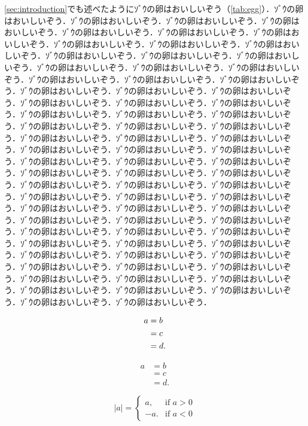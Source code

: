 \documentclass[
	10pt,
	a4j,		%
	twocolumn,	%
	uplatex
]{jsarticle}
\renewcommand{\ref}{\cref}
\begin{document}
\ref{sec:introduction}でも述べたようにｿﾞｳの卵はおいしいぞう（\ref{tab:egg}）．ｿﾞｳの卵はおいしいぞう．ｿﾞｳの卵はおいしいぞう．ｿﾞｳの卵はおいしいぞう．ｿﾞｳの卵はおいしいぞう．ｿﾞｳの卵はおいしいぞう．ｿﾞｳの卵はおいしいぞう．ｿﾞｳの卵はおいしいぞう．ｿﾞｳの卵はおいしいぞう．ｿﾞｳの卵はおいしいぞう．ｿﾞｳの卵はおいしいぞう．ｿﾞｳの卵はおいしいぞう．ｿﾞｳの卵はおいしいぞう．ｿﾞｳの卵はおいしいぞう．ｿﾞｳの卵はおいしいぞう．ｿﾞｳの卵はおいしいぞう．ｿﾞｳの卵はおいしいぞう．ｿﾞｳの卵はおいしいぞう．ｿﾞｳの卵はおいしいぞう．ｿﾞｳの卵はおいしいぞう．ｿﾞｳの卵はおいしいぞう．ｿﾞｳの卵はおいしいぞう．ｿﾞｳの卵はおいしいぞう．ｿﾞｳの卵はおいしいぞう．ｿﾞｳの卵はおいしいぞう．ｿﾞｳの卵はおいしいぞう．ｿﾞｳの卵はおいしいぞう．ｿﾞｳの卵はおいしいぞう．ｿﾞｳの卵はおいしいぞう．ｿﾞｳの卵はおいしいぞう．ｿﾞｳの卵はおいしいぞう．ｿﾞｳの卵はおいしいぞう．ｿﾞｳの卵はおいしいぞう．ｿﾞｳの卵はおいしいぞう．ｿﾞｳの卵はおいしいぞう．ｿﾞｳの卵はおいしいぞう．ｿﾞｳの卵はおいしいぞう．ｿﾞｳの卵はおいしいぞう．ｿﾞｳの卵はおいしいぞう．ｿﾞｳの卵はおいしいぞう．ｿﾞｳの卵はおいしいぞう．ｿﾞｳの卵はおいしいぞう．ｿﾞｳの卵はおいしいぞう．ｿﾞｳの卵はおいしいぞう．ｿﾞｳの卵はおいしいぞう．ｿﾞｳの卵はおいしいぞう．ｿﾞｳの卵はおいしいぞう．ｿﾞｳの卵はおいしいぞう．ｿﾞｳの卵はおいしいぞう．ｿﾞｳの卵はおいしいぞう．ｿﾞｳの卵はおいしいぞう．ｿﾞｳの卵はおいしいぞう．ｿﾞｳの卵はおいしいぞう．ｿﾞｳの卵はおいしいぞう．ｿﾞｳの卵はおいしいぞう．ｿﾞｳの卵はおいしいぞう．ｿﾞｳの卵はおいしいぞう．ｿﾞｳの卵はおいしいぞう．ｿﾞｳの卵はおいしいぞう．ｿﾞｳの卵はおいしいぞう．ｿﾞｳの卵はおいしいぞう．ｿﾞｳの卵はおいしいぞう．ｿﾞｳの卵はおいしいぞう．ｿﾞｳの卵はおいしいぞう．ｿﾞｳの卵はおいしいぞう．ｿﾞｳの卵はおいしいぞう．ｿﾞｳの卵はおいしいぞう．ｿﾞｳの卵はおいしいぞう．ｿﾞｳの卵はおいしいぞう．ｿﾞｳの卵はおいしいぞう．ｿﾞｳの卵はおいしいぞう．ｿﾞｳの卵はおいしいぞう．ｿﾞｳの卵はおいしいぞう．ｿﾞｳの卵はおいしいぞう．ｿﾞｳの卵はおいしいぞう．ｿﾞｳの卵はおいしいぞう．

\begin{align}
\label{eq:equation1}
a &= b	\\
&= c	\notag\\
\label{eq:equation2}
&= d.
\end{align}

\begin{equation}
\label{eq:equation3}
\begin{aligned}
a &= b	\\
&= c	\\
&= d.
\end{aligned}
\end{equation}

\begin{equation}
\label{eq:equation4}
|a| =
\begin{cases}
a,  & \text{if $a>0$}\\
-a. & \text{if $a<0$}
\end{cases}
\end{equation}
\end{document}
